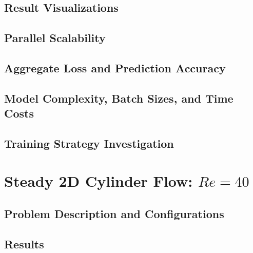 \documentclass[font=STIX2]{gw-dissertation}[2021/11/19]
\begin{document}
        \subsection{Result Visualizations}
        \label{sec:pinn-2d-tgv-vis}
        

        \subsection{Parallel Scalability}
        \label{sec:pinn-2d-tgv-scaling}
        

        \subsection{Aggregate Loss and Prediction Accuracy}
        \label{sec:pinn-2d-tgv-loss-vs-accuracy}
        

        \subsection{Model Complexity, Batch Sizes, and Time Costs}
        \label{sec:pinn-2d-tgv-model-complexity}
        

        \subsection{Training Strategy Investigation}
        \label{sec:pinn-2d-tgv-training-strategy}
        

    \section{Steady 2D Cylinder Flow: \texorpdfstring{$Re=40$}{re40}}
    \label{sec:pinn-2d-cylinder-re40}

        \subsection{Problem Description and Configurations}
        \label{sec:pinn-2d-cylinder-re40-conf}
        

        \subsection{Results}
        \label{sec:pinn-2d-cylinder-re40-results}
        
\end{document}
